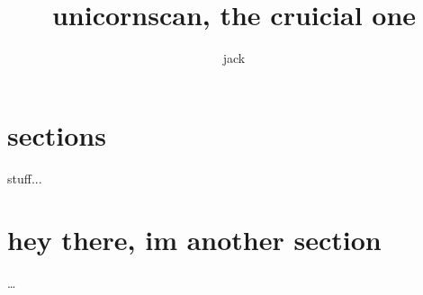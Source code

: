 \documentclass[12pt]{article}
\title{unicornscan, the cruicial one}
\author{jack}
\begin{document}
\maketitle
\section{sections}
stuff...
\section{hey there, im another section}
\ldots{}
\end{document}
